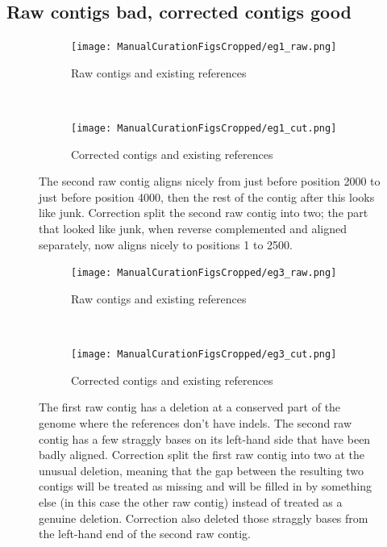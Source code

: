 \documentclass{article}
\begin{document}
\begin{landscape}


\clearpage
\subsection{Raw contigs bad, corrected contigs good}

\begin{figure}[!h]
\centering
\begin{subfigure}{1.3\textwidth}
\texttt{[image: ManualCurationFigsCropped/eg1\_raw.png]}
\caption{Raw contigs and existing references}
\end{subfigure}
\vspace*{1cm} \\
\begin{subfigure}{1.3\textwidth}

\texttt{[image: ManualCurationFigsCropped/eg1\_cut.png]}
\caption{Corrected contigs and existing references}
\end{subfigure}
\caption{The second raw contig aligns nicely from just before position 2000 to just before position 4000, then the rest of the contig after this looks like junk.
Correction split the second raw contig into two; the part that looked like junk, when reverse complemented and aligned separately, now aligns nicely to positions 1 to 2500.}
\end{figure}

\begin{figure}[!h]
\centering
\begin{subfigure}{1.3\textwidth}

\texttt{[image: ManualCurationFigsCropped/eg3\_raw.png]}
\caption{Raw contigs and existing references}
\end{subfigure}
\vspace*{1cm} \\
\begin{subfigure}{1.3\textwidth}

\texttt{[image: ManualCurationFigsCropped/eg3\_cut.png]}
\caption{Corrected contigs and existing references}
\end{subfigure}
\caption{The first raw contig has a deletion at a conserved part of the genome where the references don't have indels.
The second raw contig has a few straggly bases on its left-hand side that have been badly aligned.
Correction split the first raw contig into two at the unusual deletion, meaning that the gap between the resulting two contigs will be treated as missing and will be filled in by something else (in this case the other raw contig) instead of treated as a genuine deletion.
Correction also deleted those straggly bases from the left-hand end of the second raw contig.}
\end{figure}


\end{landscape}
\end{document}

